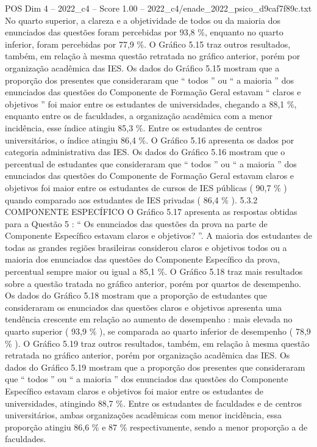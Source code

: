 \begin{textsample}{POS Dim 4 – 2022\_c4 – Score 1.00 – 2022\_c4/enade\_2022\_psico\_d9caf7f89c.txt}
No quarto superior, a clareza e a objetividade de todos ou da maioria dos enunciados das questões foram percebidas por 93,8 \%, enquanto no quarto inferior, foram percebidas por 77,9 \%.
O Gráfico 5.15 traz outros resultados, também, em relação à mesma questão retratada no gráfico anterior, porém por organização acadêmica das IES.
Os dados do Gráfico 5.15 mostram que a proporção dos presentes que consideraram que “ todos ” ou “ a maioria ” dos enunciados das questões do Componente de Formação Geral estavam “ claros e objetivos ” foi maior entre os estudantes de universidades, chegando a 88,1 \%, enquanto entre os de faculdades, a organização acadêmica com a menor incidência, esse índice atingiu 85,3 \%.
Entre os estudantes de centros universitários, o índice atingiu 86,4 \%.
O Gráfico 5.16 apresenta os dados por categoria administrativa das IES.
Os dados do Gráfico 5.16 mostram que o percentual de estudantes que consideraram que “ todos ” ou “ a maioria ” dos enunciados das questões do Componente de Formação Geral estavam claros e objetivos foi maior entre os estudantes de cursos de IES públicas ( 90,7 \% ) quando comparado aos estudantes de IES privadas ( 86,4 \% ). 5.3.2 COMPONENTE ESPECÍFICO O Gráfico 5.17 apresenta as respostas obtidas para a Questão 5 : “ Os enunciados das questões da prova na parte de Componente Específico estavam claros e objetivos? ”.
A maioria dos estudantes de todas as grandes regiões brasileiras considerou claros e objetivos todos ou a maioria dos enunciados das questões do Componente Específico da prova, percentual sempre maior ou igual a 85,1 \%.
O Gráfico 5.18 traz mais resultados sobre a questão tratada no gráfico anterior, porém por quartos de desempenho.
Os dados do Gráfico 5.18 mostram que a proporção de estudantes que consideraram os enunciados das questões claros e objetivos apresenta uma tendência crescente em relação ao aumento de desempenho : mais elevada no quarto superior ( 93,9 \% ), se comparada ao quarto inferior de desempenho ( 78,9 \% ).
O Gráfico 5.19 traz outros resultados, também, em relação à mesma questão retratada no gráfico anterior, porém por organização acadêmica das IES.
Os dados do Gráfico 5.19 mostram que a proporção dos presentes que consideraram que “ todos ” ou “ a maioria ” dos enunciados das questões do Componente Específico estavam claros e objetivos foi maior entre os estudantes de universidades, atingindo 88,7 \%.
Entre os estudantes de faculdades e de centros universitários, ambas organizações acadêmicas com menor incidência, essa proporção atingiu 86,6 \% e 87 \% respectivamente, sendo a menor proporção a de faculdades.

\end{textsample}
